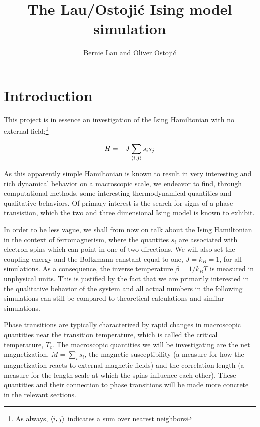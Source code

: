 \documentclass[11pt,a4paper]{article}
\title{The Lau/Ostoji\'c Ising model simulation}
\date{}
\author{Bernie Lau and Oliver Ostoji\'c}
\DeclarePairedDelimiter{\avg}{\langle}{\rangle}
\begin{document}
\maketitle

\section{Introduction}

This project is in essence an investigation of the Ising Hamiltonian with no external field;\footnote{As always,
$\avg{i,j}$ indicates a sum over nearest neighbors}

\begin{equation}\label{eq:Hamiltonian}
    H = -J \sum_{\avg*{i,j}} s_i s_j
\end{equation}

As this apparently simple Hamiltonian is known to result in very interesting and rich dynamical behavior on a 
 macroscopic scale, we endeavor to find, through computational methods, some interesting thermodynamical quantities
 and qualitative behaviors. Of primary interest is the search for signs of a phase transistion, which the two and three
 dimensional Ising model is known to exhibit.

 In order to be less vague, we shall from now on talk about the Ising Hamiltonian
 in the context of ferromagnetism, where the quantites $s_i$ are associated with electron spins which can point in one of two
 directions. We will also set the coupling energy and the Boltzmann canstant equal to one, 
 $J = k_B = 1$, for all simulations. As a consequence, the inverse temperature $\beta = 1/k_BT$ is measured in unphysical
 units. This is justified by the
 fact that  we are primarily interested in the qualitative behavior of the system and all actual numbers in the following
 simulations can still be compared to theoretical calculations and similar simulations.

 Phase transitions are typically characterized by rapid changes in macroscopic quantities near the transition temperature, which
 is called the critical temperature, $T_c$. The macroscopic quantities we will be investigating are the net magnetization,
 $M = \sum_i s_i$, the magnetic susceptibility (a measure for how the magnetization reacts to external magnetic fields) and
 the correlation length (a measure for the length scale at which the spins influence each other). These quantities and their
 connection to phase transitions will be made more concrete in the relevant sections. 
\end{document}
